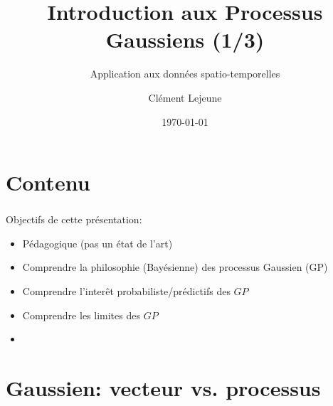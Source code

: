 \documentclass[xcolor=svgnames, t]{beamer}
\title[Introduction aux Processus Gaussiens]{Introduction aux Processus Gaussiens (1/3)}
\subtitle{Application aux données spatio-temporelles}
\institute[]{}
\author[Cl\'ement Lejeune]{Cl\'ement Lejeune}
\institute[TSN/AD/AD3/IA]{
Thales Services Numériques,
\\ AD/AD3/IA
}
\date{\today}
\begin{document}
\frame{\titlepage}

\section{Contenu}
\begin{frame}\frametitle{\secname}
  Objectifs de cette présentation:
  \begin{itemize}
    \item Pédagogique (pas un état de l'art)
    \pause
    \item Comprendre la philosophie (Bayésienne) des processus Gaussien (GP)
    \pause
    \item Comprendre l'interêt probabiliste/prédictifs des $GP$
    \pause
    \item Comprendre les limites des $GP$
    \pause
    \item 
  \end{itemize}
\end{frame}

\AtBeginSubsection[]
{
  \begin{frame}\frametitle{\secname}
    \tableofcontents[currentsubsection]
  \end{frame}
}

\section{Gaussien: vecteur vs. processus}
\end{document}
